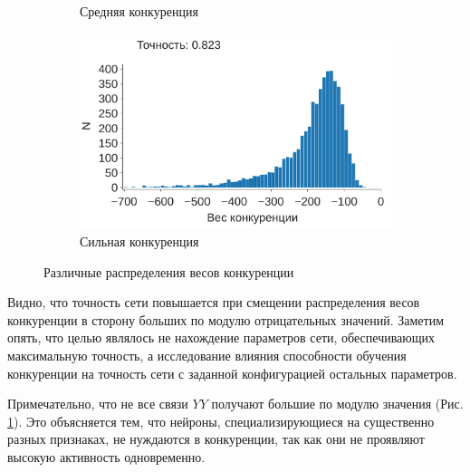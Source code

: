 \documentclass[a4paper]{article}
\begin{document}
\begin{figure}
\begin{subfigure}{0.45\textwidth}
    \caption{Средняя конкуренция} 
\end{subfigure}
\begin{subfigure}{0.45\textwidth}
    \includegraphics[width=\textwidth,keepaspectratio=true]{competition_distribution_best_ru.pdf}
    \caption{Сильная конкуренция}
    \label{fig:best_competition}
\end{subfigure}
\caption{Различные распределения весов конкуренции}
\label{fig:competition_distributions}
\end{figure}

Видно, что точность сети повышается при смещении распределения весов конкуренции в сторону больших по модулю отрицательных значений. Заметим опять, что целью являлось не нахождение параметров сети, обеспечивающих максимальную точность, а исследование влияния способности обучения конкуренции на точность сети с заданной конфигурацией остальных параметров.

Примечательно, что не все связи $YY$ получают большие по модулю значения (Рис. \ref{fig:best_competition}). Это объясняется тем, что нейроны, специализирующиеся на существенно разных признаках, не нуждаются в конкуренции, так как они не проявляют высокую активность одновременно.
\end{document}
